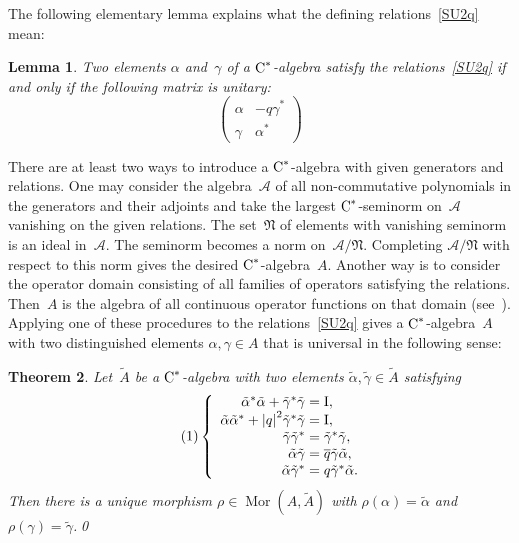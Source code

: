 \documentclass[a4paper]{amsart}
\numberwithin{equation}{section}
\newtheorem{Thm}{Theorem}[section]
\newtheorem{Lem}[Thm]{Lemma}
\theoremstyle{definition}
\theoremstyle{remark}
\begin{document}
The following elementary lemma explains what the defining
relations~\eqref{SU2q} mean:

\begin{Lem}
  \label{un}
  Two elements $\alpha$ and~$\gamma$ of a ${\textup{C}^*}${\nobreakdash}-algebra satisfy
  the relations~\eqref{SU2q} if and only if the following matrix is
  unitary:
  \[
  \begin{pmatrix}\alpha&-q\gamma^{*}\\\gamma&\alpha^{*}\end{pmatrix}
  \]
\end{Lem}

There are at least two ways to introduce a ${\textup{C}^*}${\nobreakdash}-algebra with
given generators and relations.  One may consider the
algebra~$\mathcal{{A}}$ of all non-commutative polynomials in the
generators and their adjoints and take the largest ${\textup{C}^*}${\nobreakdash}-seminorm
on~$\mathcal{{A}}$ vanishing on the given relations.  The
set~${\mathfrak{N}}$ of elements with vanishing seminorm is an ideal
in~$\mathcal{{A}}$.  The seminorm becomes a norm
on~$\mathcal{{A}}/{\mathfrak{N}}$.  Completing
$\mathcal{{A}}/{\mathfrak{N}}$ with respect to this norm gives the
desired ${\textup{C}^*}${\nobreakdash}-algebra~$A$.  Another way is to consider the
operator domain consisting of all families of operators satisfying the
relations.  Then~${{A}}$ is the algebra of all continuous operator
functions on that domain
(see~\cite{Kruszynski-Woronowicz:Gelfand-Naimark}).  Applying one of
these procedures to the relations~\eqref{SU2q} gives a
${\textup{C}^*}${\nobreakdash}-algebra~${{A}}$ with two distinguished elements
$\alpha,\gamma\in {{A}}$ that is universal in the following sense:

\begin{Thm}
  \label{universal}
  Let~$\widetilde{{A}}$ be a ${\textup{C}^*}${\nobreakdash}-algebra with two elements
  ${{\widetilde \alpha}},{{\widetilde\gamma}}\in\widetilde{{A}}$ satisfying
  \[
  {\label{{SU2qtil}}\stepcounter{equation}\tag{\theequation}}
  \left\{
    \begin{array}{r@{\;=\;}l}
      \tilde\alpha^{*}\tilde\alpha+\tilde\gamma^{*}\tilde\gamma&{\textup{I}},\\
      \tilde\alpha\tilde\alpha^{*}+{\left|{q}\right|}^{2}\tilde\gamma^{*}\tilde\gamma&{\textup{I}},\\
      \tilde\gamma\tilde\gamma^{*}&\tilde\gamma^{*}\tilde\gamma,\\
      \tilde\alpha\tilde\gamma&{\overline{q}}\tilde\gamma\tilde\alpha,\\
      \tilde\alpha\tilde\gamma^{*}&q\tilde\gamma^{*}\tilde\alpha.
    \end{array}
  \right.
  \]
  Then there is a unique morphism
  $\rho\in{\operatorname{Mor}}({{A}},\widetilde{{A}})$ with
  \(\rho(\alpha)={{\widetilde \alpha}}\) and \(\rho(\gamma)={{\widetilde\gamma}}\).\qed
\end{Thm}
\end{document}
